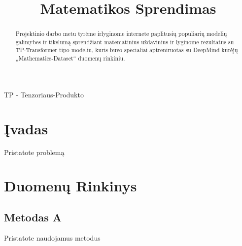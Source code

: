 \documentclass[conference]{IEEEtran}
\begin{document}
\title{Matematikos Sprendimas}

\author{
\and
{}
\and
{}
}

\maketitle

\begin{abstract}
Projektinio darbo metu tyrėme irlyginome internete paplitusių populiarių modelių
galimybes ir tikslumą sprendžiant matematinius uždavinius ir lyginome rezultatus su
TP-Transformer tipo modeliu, kuris buvo specialiai aptreniruotas su DeepMind kūrėjų
„Mathematics-Dataset“ duomenų rinkiniu.
\end{abstract}

\begin{IEEEkeywords}
TP - Tenzoriaus-Produkto
\end{IEEEkeywords}

\section{Įvadas}
Pristatote problemą

\section{Duomenų Rinkinys}

\subsection{Metodas A}

Pristatote naudojamus metodus
\end{document}
